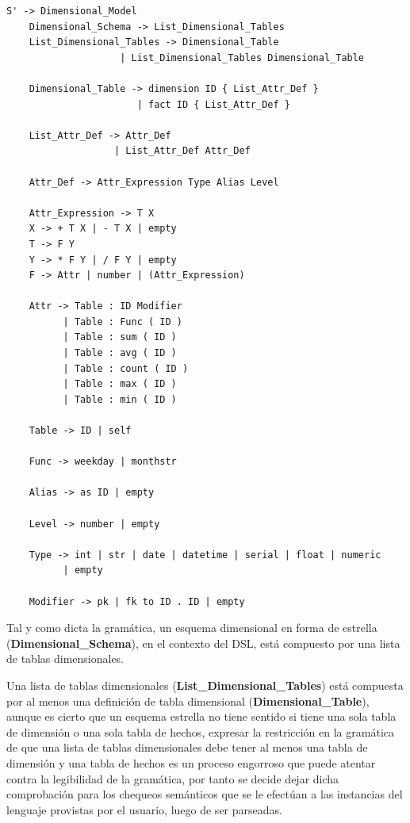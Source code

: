 \begin{lstlisting}[label={code:CFG},caption={Gram\'atica libre del contexto del lenguaje de dominio espec\'ifico}]
    S' -> Dimensional_Model
    Dimensional_Schema -> List_Dimensional_Tables
    List_Dimensional_Tables -> Dimensional_Table
                    | List_Dimensional_Tables Dimensional_Table

    Dimensional_Table -> dimension ID { List_Attr_Def }
                       | fact ID { List_Attr_Def }

    List_Attr_Def -> Attr_Def
                   | List_Attr_Def Attr_Def

    Attr_Def -> Attr_Expression Type Alias Level

    Attr_Expression -> T X
    X -> + T X | - T X | empty
    T -> F Y
    Y -> * F Y | / F Y | empty
    F -> Attr | number | (Attr_Expression)

    Attr -> Table : ID Modifier
          | Table : Func ( ID )
          | Table : sum ( ID )
          | Table : avg ( ID )
          | Table : count ( ID )
          | Table : max ( ID )
          | Table : min ( ID )

    Table -> ID | self

    Func -> weekday | monthstr

    Alias -> as ID | empty

    Level -> number | empty

    Type -> int | str | date | datetime | serial | float | numeric 
          | empty

    Modifier -> pk | fk to ID . ID | empty
\end{lstlisting}

Tal y como dicta la gramática, un esquema dimensional en forma de estrella (\textbf{Dimensional\_Schema}), 
en el contexto del DSL, est\'a compuesto por una lista de tablas 
dimensionales. 

Una lista de tablas dimensionales (\textbf{List\_Dimensional\_Tables}) est\'a compuesta por al menos 
una definición de tabla dimensional 
(\textbf{Dimensional\_Table}), aunque es cierto que un esquema estrella no tiene sentido si tiene una sola tabla 
de dimensión o una sola tabla de hechos, expresar la restricción en la gramática de que una lista de 
tablas dimensionales debe tener al menos una tabla de dimensión y una tabla de hechos es un proceso 
engorroso que puede atentar contra la legibilidad de la gramática, por tanto se decide dejar dicha 
comprobación para los chequeos semánticos que se le efectúan a las instancias del lenguaje provistas 
por el usuario, luego de ser parseadas. 

